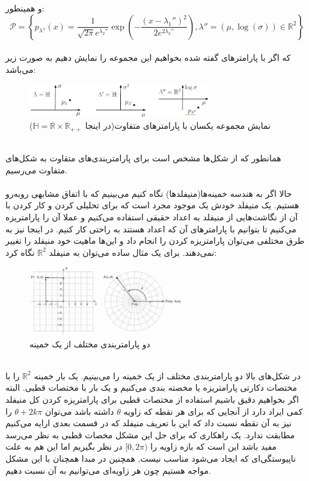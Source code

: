 و همینطور:
\begin{equation}
    \mathcal{P}=\left\{p_{\lambda''}(x)=\frac{1}{\sqrt{2\pi}e^{\lambda_2''}}\exp\left(-\frac{(x-\lambda_1'')^2}{2e^{2\lambda_2''}}\right), \lambda''=(\mu, \log(\sigma))\in\mathbb{R}^2\right\}
\end{equation}\\
که اگر با پارامترهای گفته شده بخواهیم این مجموعه را نمایش دهیم به صورت زیر می‌باشد:\\
\begin{figure}[h!]
    \centering
    \includegraphics[width=0.7\textwidth]{Pictures/Q1/2.png}
    \caption{نمایش مجموعه یکسان با پارامترهای متفاوت(در اینجا $\mathbb{H}=\mathbb{R}\times \mathbb{R_{++}}$)}
\end{figure}\\
همانطور که از شکل‌ها مشخص است برای پارامتربندی‌های متقاوت به شکل‌های متفاوت می‌رسیم.\\
\\
حالا اگر به هندسه خمینه‌ها(منیفلدها) نگاه کنیم می‌بینیم که با اتفاق مشابهی روبه‌رو هستیم. یک منیفلد خودش یک موجود مجرد است که برای تحلیلی کردن و کار کردن با آن از نگاشت‌هایی از منیفلد به اعداد حقیقی استفاده می‌کنیم و عملا آن را پارامتریزه می‌کنیم تا بتوانیم با پارامترهای آن که اعداد هستند به راحتی کار کنیم. در اینجا نیز به طرق مختلفی می‌توان پارامتریزه کردن را انجام داد و این‌ها ماهیت خود منیفلد را تغییر نمی‌دهند. برای یک مثال ساده می‌توان به منیفلد $\mathbb{R}^2$ نگاه کرد:
\begin{figure}[h!]
    \centering
    \includegraphics[width=0.6\textwidth]{Pictures/Q1/3.png}
    \caption{دو پارامتربندی مختلف از یک خمینه}
\end{figure}\\
در شکل‌های بالا دو پارامتربندی مختلف از یک خمینه را می‌بینیم. یک بار خمینه $\mathbb{R}^2$ را با مختصات دکارتی پارامتریزه یا مخصته بندی می‌کنیم و یک بار با مختصات قطبی. البته اگر بخواهیم دقیق باشیم استفاده از مختصات قطبی برای پارامتریزه کردن کل منیفلد کمی ایراد دارد از آنجایی که برای هر نقطه که زاویه $\theta$ داشته باشد می‌توان $\theta+2k\pi$ را نیز به آن نقطه نسبت داد که این با تعریف منیفلد که در قسمت بعدی ارایه می‌کنیم مطابقت ندارد. یک راهکاری که برای حل این مشکل مخصات قطبی به نظر می‌رسد مفید باشد این است که بازه زاویه را $[0,2\pi)$ در نظر بگیریم اما این هم به علت ناپیوستگی‌ای که ایجاد می‌شود مناسب نیست, همچنین در مبدا همچنان با این مشکل مواجه هستیم چون هر زاویه‌ای می‌توانیم به آن نسبت دهیم.